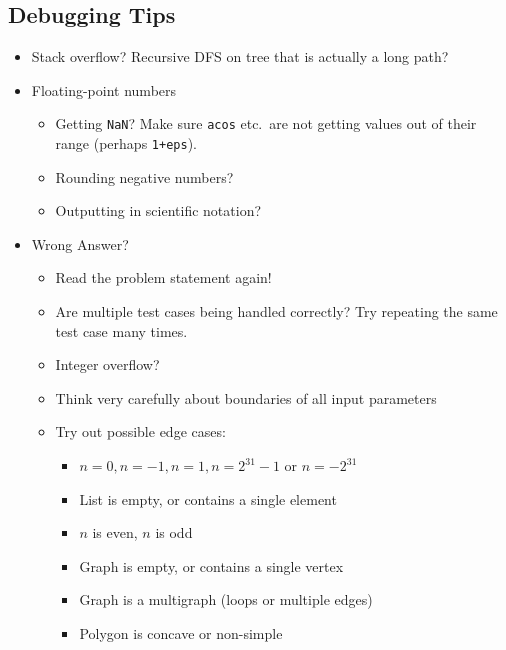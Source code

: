 \documentclass[11.5pt,a4paper,landscape,oneside]{amsart}
\newenvironment{myitemize}
{ \begin{itemize}[leftmargin=.5cm]
    \setlength{\itemsep}{0pt}
    \setlength{\parskip}{0pt}
    \setlength{\parsep}{0pt}     }
{ \end{itemize}                  }
\begin{document}
\begin{multicols*}{2}
        \subsection{Debugging Tips}
            \begin{myitemize}
                \item Stack overflow? Recursive DFS on tree that is actually a long path?
                \item Floating-point numbers
                    \begin{itemize}
                        \item Getting \texttt{NaN}? Make sure \texttt{acos} etc.\ are
                            not getting values out of their range (perhaps
                            \texttt{1+eps}).
                        \item Rounding negative numbers?
                        \item Outputting in scientific notation?
                    \end{itemize}
                \item Wrong Answer?
                    \begin{itemize}
                        \item Read the problem statement again!
                        \item Are multiple test cases being handled correctly?
                              Try repeating the same test case many times.
                        \item Integer overflow?
                        \item Think very carefully about boundaries of all input parameters
                        \item Try out possible edge cases:
                            \begin{itemize}
                                \item $n=0, n=-1, n=1, n=2^{31}-1$ or $n=-2^{31}$
                                \item List is empty, or contains a single element
                                \item $n$ is even, $n$ is odd
                                \item Graph is empty, or contains a single vertex
                                \item Graph is a multigraph (loops or multiple edges)
                                \item Polygon is concave or non-simple

\end{itemize}
\end{itemize}
\end{myitemize}
\end{multicols*}
\end{document}
